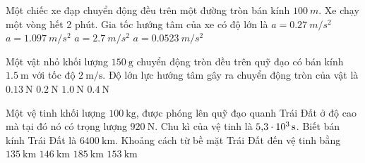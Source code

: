 \begin{ex}
	Một chiếc xe đạp chuyển động đều trên một đường tròn bán kính $\SI{100}{m}$. Xe chạy một vòng hết 2 phút. Gia tốc hướng tâm của xe có độ lớn là
	\choice
	{\True $a = \SI{0,27}{m/s^2}$}
	{$a = \SI{1,097}{m/s^2}$}
	{$a = \SI{2,7}{m/s^2}$}
	{$a = \SI{0,0523}{m/s^2}$}
\end{ex}
\begin{ex}
Một vật nhỏ khối lượng $\SI{150}{\gram}$ chuyển động tròn đều trên quỹ đạo có bán kính $\SI{1.5}{\meter}$ với tốc độ $\SI{2}{\meter/\second}$. Độ lớn lực hướng tâm gây ra chuyển động tròn của vật là	
	\choice
	{$\SI{0.13}{\newton}$}
	{$\SI{0.2}{\newton}$}
	{$\SI{1.0}{\newton}$}
	{\True $\SI{0.4}{\newton}$}
\end{ex}
\begin{ex}
Một vệ tinh khối lượng $\SI{100}{\kilogram}$, được phóng lên quỹ đạo quanh Trái Đất ở độ cao mà tại đó nó có trọng lượng $\SI{920}{\newton}$. Chu kì của vệ tinh là $\SI{5.3E3}{\second}$. Biết bán kính Trái Đất là $\SI{6400}{\kilo\meter}$. Khoảng cách từ bề mặt Trái Đất đến vệ tinh bằng	
	\choice
	{$\SI{135}{\kilo\meter}$}
	{$\SI{146}{\kilo\meter}$}
	{$\SI{185}{\kilo\meter}$}
	{\True $\SI{153}{\kilo\meter}$}
\end{ex}
